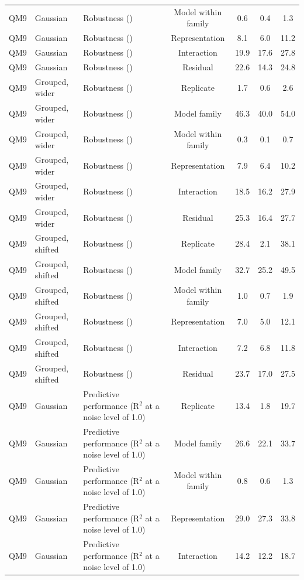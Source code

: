 \begin{landscape}
{\begin{longtable}{lllcccc}
QM9 & Gaussian & Robustness (\aucnorm{}) & Model within family & 0.6 & 0.4 & 1.3 \\
QM9 & Gaussian & Robustness (\aucnorm{}) & Representation & 8.1 & 6.0 & 11.2 \\
QM9 & Gaussian & Robustness (\aucnorm{}) & Interaction & 19.9 & 17.6 & 27.8 \\
QM9 & Gaussian & Robustness (\aucnorm{}) & Residual & 22.6 & 14.3 & 24.8 \\
QM9 & Grouped, wider & Robustness (\aucnorm{}) & Replicate & 1.7 & 0.6 & 2.6 \\
QM9 & Grouped, wider & Robustness (\aucnorm{}) & Model family & 46.3 & 40.0 & 54.0 \\
QM9 & Grouped, wider & Robustness (\aucnorm{}) & Model within family & 0.3 & 0.1 & 0.7 \\
QM9 & Grouped, wider & Robustness (\aucnorm{}) & Representation & 7.9 & 6.4 & 10.2 \\
QM9 & Grouped, wider & Robustness (\aucnorm{}) & Interaction & 18.5 & 16.2 & 27.9 \\
QM9 & Grouped, wider & Robustness (\aucnorm{}) & Residual & 25.3 & 16.4 & 27.7 \\
QM9 & Grouped, shifted & Robustness (\aucnorm{}) & Replicate & 28.4 & 2.1 & 38.1 \\
QM9 & Grouped, shifted & Robustness (\aucnorm{}) & Model family & 32.7 & 25.2 & 49.5 \\
QM9 & Grouped, shifted & Robustness (\aucnorm{}) & Model within family & 1.0 & 0.7 & 1.9 \\
QM9 & Grouped, shifted & Robustness (\aucnorm{}) & Representation & 7.0 & 5.0 & 12.1 \\
QM9 & Grouped, shifted & Robustness (\aucnorm{}) & Interaction & 7.2 & 6.8 & 11.8 \\
QM9 & Grouped, shifted & Robustness (\aucnorm{}) & Residual & 23.7 & 17.0 & 27.5 \\
QM9 & Gaussian & Predictive performance (R$^2$ at a noise level of 1.0) & Replicate & 13.4 & 1.8 & 19.7 \\
QM9 & Gaussian & Predictive performance (R$^2$ at a noise level of 1.0) & Model family & 26.6 & 22.1 & 33.7 \\
QM9 & Gaussian & Predictive performance (R$^2$ at a noise level of 1.0) & Model within family & 0.8 & 0.6 & 1.3 \\
QM9 & Gaussian & Predictive performance (R$^2$ at a noise level of 1.0) & Representation & 29.0 & 27.3 & 33.8 \\
QM9 & Gaussian & Predictive performance (R$^2$ at a noise level of 1.0) & Interaction & 14.2 & 12.2 & 18.7 \\

\end{longtable}}
\end{landscape}
